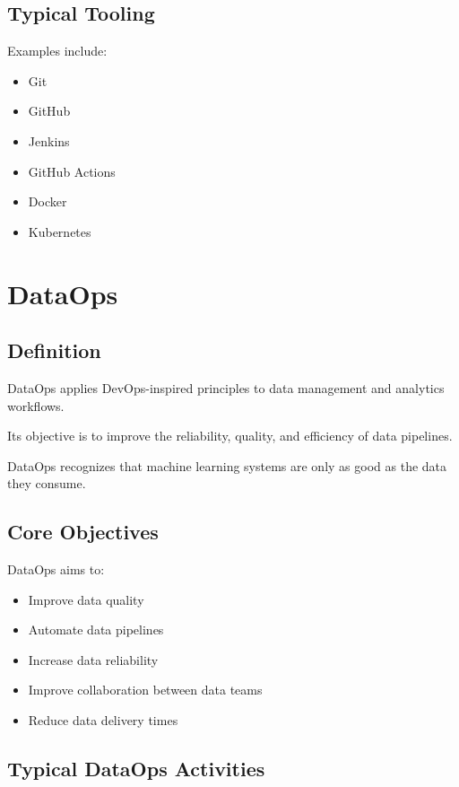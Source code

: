 \subsection{Typical Tooling}

Examples include:

\begin{itemize}
    \item Git
    \item GitHub
    \item Jenkins
    \item GitHub Actions
    \item Docker
    \item Kubernetes
\end{itemize}

\section{DataOps}

\subsection{Definition}

DataOps applies DevOps-inspired principles to data management and analytics workflows.

Its objective is to improve the reliability, quality, and efficiency of data pipelines.

DataOps recognizes that machine learning systems are only as good as the data they consume.

\subsection{Core Objectives}

DataOps aims to:

\begin{itemize}
    \item Improve data quality
    \item Automate data pipelines
    \item Increase data reliability
    \item Improve collaboration between data teams
    \item Reduce data delivery times
\end{itemize}

\subsection{Typical DataOps Activities}

